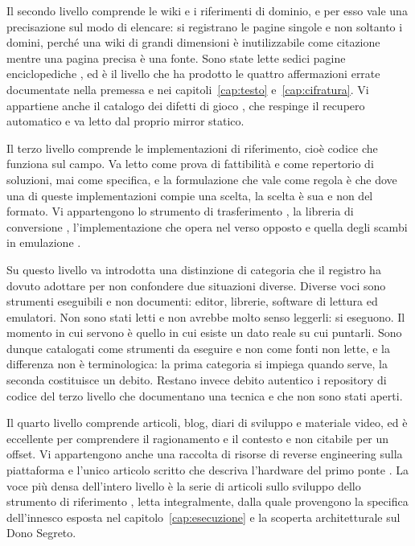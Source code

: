 Il secondo livello comprende le wiki e i riferimenti di dominio, e per esso vale una precisazione sul modo di elencare: si registrano le pagine singole e non soltanto i domini, perché una wiki di grandi dimensioni è inutilizzabile come citazione mentre una pagina precisa è una fonte. Sono state lette sedici pagine enciclopediche \cite{bulbapedia}, ed è il livello che ha prodotto le quattro affermazioni errate documentate nella premessa e nei capitoli~\ref{cap:testo} e~\ref{cap:cifratura}. Vi appartiene anche il catalogo dei difetti di gioco \cite{glitchcity}, che respinge il recupero automatico e va letto dal proprio mirror statico.

Il terzo livello comprende le implementazioni di riferimento, cioè codice che funziona sul campo. Va letto come prova di fattibilità e come repertorio di soluzioni, mai come specifica, e la formulazione che vale come regola è che dove una di queste implementazioni compie una scelta, la scelta è sua e non del formato. Vi appartengono lo strumento di trasferimento \cite{ptgb}, la libreria di conversione \cite{pccs}, l'implementazione che opera nel verso opposto \cite{gen3togenx} e quella degli scambi in emulazione \cite{pokemongb-online}.

Su questo livello va introdotta una distinzione di categoria che il registro ha dovuto adottare per non confondere due situazioni diverse. Diverse voci sono strumenti eseguibili e non documenti: editor, librerie, software di lettura ed emulatori. Non sono stati letti e non avrebbe molto senso leggerli: si eseguono. Il momento in cui servono è quello in cui esiste un dato reale su cui puntarli. Sono dunque catalogati come strumenti da eseguire e non come fonti non lette, e la differenza non è terminologica: la prima categoria si impiega quando serve, la seconda costituisce un debito. Restano invece debito autentico i repository di codice del terzo livello che documentano una tecnica e che non sono stati aperti.

Il quarto livello comprende articoli, blog, diari di sviluppo e materiale video, ed è eccellente per comprendere il ragionamento e il contesto e non citabile per un offset. Vi appartengono anche una raccolta di risorse di reverse engineering sulla piattaforma \cite{retroreversing} e l'unico articolo scritto che descriva l'hardware del primo ponte \cite{hackaday-ponte}. La voce più densa dell'intero livello è la serie di articoli sullo sviluppo dello strumento di riferimento \cite{devlog-ptgb}, letta integralmente, dalla quale provengono la specifica dell'innesco esposta nel capitolo~\ref{cap:esecuzione} e la scoperta architetturale sul Dono Segreto.

